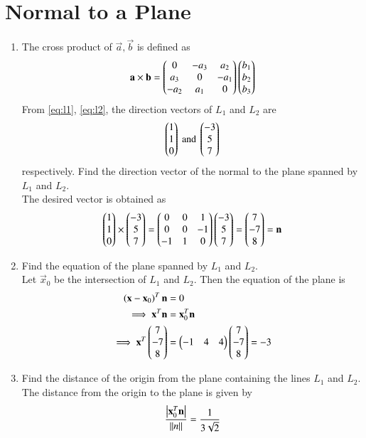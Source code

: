 \documentclass[journal,12pt,twocolumn]{IEEEtran}
\renewcommand\thesection{\arabic{section}}
\begin{document}
\section{Normal to a Plane}
\begin{enumerate}[label=\thesection.\arabic*
,ref=\thesection.\theenumi]
\item The cross product of $\vec{a},\vec{b}$ is defined as
\begin{equation}
\label{eq:cross}
\mathbf{a}\times \mathbf{b} = \begin{pmatrix}0 & -a_3 & a_2 \\ a_3 & 0 & -a_1 \\ -a_2 & a_1 & 0\end{pmatrix}\begin{pmatrix}b_1 \\ b_2 \\ b_3\end{pmatrix}
\end{equation}
From \eqref{eq:l1}, \eqref{eq:l2}, the direction vectors of $L_1$ and $L_2$ are
\begin{equation}
\begin{pmatrix}1 \\ 1 \\ 0\end{pmatrix} \text{ and } \begin{pmatrix}-3 \\ 5 \\ 7\end{pmatrix}
\end{equation}
respectively. Find the direction vector of the normal to the plane spanned by $L_1$ and $L_2$.
\\
\solution The desired vector is obtained as
\begin{align}
\begin{pmatrix}1 \\ 1 \\ 0\end{pmatrix} \times \begin{pmatrix}-3 \\ 5 \\ 7\end{pmatrix} = 
 \begin{pmatrix}0 & 0 & 1 \\ 0 & 0 & -1 \\ -1 & 1 & 0\end{pmatrix}\begin{pmatrix}-3 \\ 5 \\ 7\end{pmatrix}
= \begin{pmatrix}7 \\ -7 \\ 8\end{pmatrix} = \mathbf{n}
\end{align}
\item Find the equation of the plane spanned by $L_1$ and $L_2$.
\\
\solution Let $\vec{x}_0$ be the intersection of $L_1$ and $L_2$.  Then the equation of the plane is
\begin{align}
\left(\mathbf{x}-\mathbf{x}_0\right)^T\mathbf{n} &= 0
\\
\implies \mathbf{x}^T\mathbf{n} &= \mathbf{x}_0^T\mathbf{n}
\\
\implies \mathbf{x}^T\begin{pmatrix}7 \\ -7 \\ 8\end{pmatrix} &= \begin{pmatrix}-1 & 4 & 4\end{pmatrix}\begin{pmatrix}7 \\ -7 \\ 8\end{pmatrix} =  -3
\end{align}
\item
Find the distance of the origin from the plane containing the lines $L_1$ and $L_2$.
\\
\solution The distance from the origin to the plane is given by
\begin{equation}
\frac{\left\vert\mathbf{x}_0^T\mathbf{n}\right\vert}{\lVert n\rVert} = \frac{1}{3\sqrt{2}}
\end{equation}
\end{enumerate}
\end{document}
